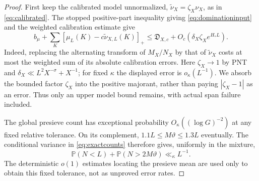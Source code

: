 \documentclass[11pt,a4paper]{article}
\newcommand{\Prob}{\mathbb P}
\begin{document}
\begin{proof}
First keep the calibrated model unnormalized,
$\widetilde\nu_X=\zeta_X\nu_X$, as in \eqref{eq:calibrated}.
The stopped positive-part inequality giving \eqref{eq:dominationinput}
and the weighted calibration estimate give
\[
 b_\mu+\sum_K[\mu_L(K)-c\widetilde\nu_{X,L}(K)]_+
 \le\mathfrak D_{X,c}+O_c(\delta_X\zeta_X e^{H_*L}).
\]
Indeed, replacing the alternating transform of $M_X/N_X$ by that of
$\widetilde\nu_X$ costs at most the weighted sum of its absolute
calibration errors. Here $\zeta_X\to1$ by PNT and
$\delta_X\ll L^2X^{-\sigma}+X^{-1}$; for fixed $\kappa$ the displayed
error is $o_\kappa(L^{-1})$. We absorb the bounded factor $\zeta_X$
into the positive majorant, rather than paying $|\zeta_X-1|$ as an error.
Thus only an upper model bound remains, with actual span failure included.

The global presieve count has exceptional probability
$O_\kappa((\log G)^{-2})$ at any fixed relative tolerance. On its
complement, $1.1L\le M\vartheta\le1.3L$ eventually. The conditional
variance in \eqref{eq:exactcounts} therefore gives, uniformly in the mixture,
\begin{equation}\label{eq:quantcounts}
 \Prob(N<L)+\Prob(N>2M\vartheta)\ll_\kappa L^{-1}.
\end{equation}
The deterministic $o(1)$ estimates locating the presieve mean are used
only to obtain this fixed tolerance, not as unproved error rates.


\end{proof}
\end{document}
